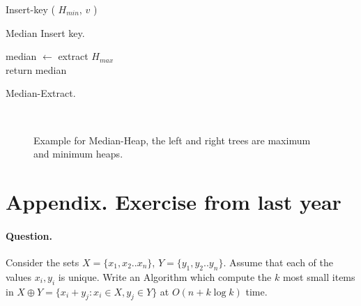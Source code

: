 \begin{algorithm}
 {
	 {
       Insert-key ( $H_{min}$, $v$ )
    }
}
\caption{Median Insert key.}
\end{algorithm}

\begin{algorithm}
median $\leftarrow$ extract $H_{max}$ \\   
return median 
\caption{Median-Extract.}
\end{algorithm}

\begin{figure}[h]
  \centering
  \begin{subfigure}[b]{0.9\textwidth}
	
  \end{subfigure}
  \\ 
\begin{subfigure}[b]{0.9\textwidth}
	
  \end{subfigure}
  \caption{ Example for Median-Heap, the left and right trees are maximum and minimum heaps.  }
\end{figure}


\ifdefined\Book 

\newpage



\section{ Appendix. Exercise from last year }

\paragraph{Question.} Consider the sets $X = \{x_1,x_2 .. x_n\}$, $Y = \{y_1, y_2 .. y_n\}$. Assume that each of the values $x_i,y_i$ is unique. Write an Algorithm which compute the $k$ most small items in $X \oplus Y = \{ x_{i} + y_{j} : x_{i} \in X , y_{j} \in Y  \} $ at $ O \left( n + k\log k  \right) $ time. 


